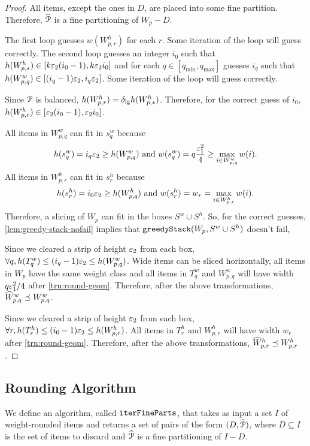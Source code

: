 \rthmPartWide*
\begin{proof}
All items, except the ones in $D$, are placed into some fine partition.
Therefore, $\widehat{\mathcal{P}}$ is a fine partitioning of $W_p - D$.

The first loop guesses $w(W^h_{p,r})$ for each $r$.
Some iteration of the loop will guess correctly.
The second loop guesses an integer $i_0$ such that
$h(W^h_{p,*}) \in [k\varepsilon_2(i_0-1), k\varepsilon_2 i_0]$
and for each $q \in [q_{\min}, q_{\max}]$ guesses $i_q$ such that
$h(W^w_{p,q}) \in [(i_q-1)\varepsilon_2, i_q\varepsilon_2]$.
Some iteration of the loop will guess correctly.

Since $\mathcal{P}$ is balanced, $h(W^h_{p,r}) = \delta_{\mathrm{lg}} h(W^h_{p,*})$.
Therefore, for the correct guess of $i_0$,
$h(W^h_{p,r}) \in [\varepsilon_2(i_0-1), \varepsilon_2 i_0]$.

All items in $W^w_{p,q}$ can fit in $s^w_q$ because
\[ h(s^w_q) = i_q\varepsilon_2 \ge h(W^w_{p,q}) \textrm{ and }
w(s^w_q) = q\frac{\varepsilon_1^2}{4} \ge \max_{i \in W^w_{p,q}} w(i). \]
All items in $W^h_{p,r}$ can fit in $s^h_r$ because
\[ h(s^h_r) = i_0\varepsilon_2 \ge h(W^h_{p,q}) \textrm{ and }
w(s^h_r) = w_r = \max_{i \in W^h_{p,r}} w(i). \]
Therefore, a slicing of $W_p$ can fit in the boxes $S^w \cup S^h$.
So, for the correct guesses, \cref{lem:greedy-stack-nofail} implies that
$\operatorname{\mathtt{greedyStack}}(W_p, S^w \cup S^h)$ doesn't fail,

Since we cleared a strip of height $\varepsilon_2$ from each box,
$\forall q, h(T^w_q) \le (i_q-1)\varepsilon_2 \le h(W^w_{p,q})$.
Wide items can be sliced horizontally, all items in $W_p$ have the same weight class
and all items in $T^w_q$ and $W^w_{p,q}$
will have width $q\varepsilon_1^2/4$ after \cref{trn:round-geom}.
Therefore, after the above transformations, $\widehat{W}^w_{p,q} \preceq W^w_{p,q}$.

Since we cleared a strip of height $\varepsilon_2$ from each box,
$\forall r, h(T^h_r) \le (i_0-1)\varepsilon_2 \le h(W^h_{p,r})$. All items in $T^h_r$
and $W^h_{p,r}$ will have width $w_r$ after \cref{trn:round-geom}.
Therefore, after the above transformations, $\widehat{W}^h_{p,r} \preceq W^h_{p,r}$.
\end{proof}

\rthmPartWideTime*

\subsection{Rounding Algorithm}

We define an algorithm, called $\operatorname{\mathtt{iterFineParts}}$, that takes as input a set $I$ of
weight-rounded items and returns a set of pairs of the form $(D, \widehat{\mathcal{P}})$,
where $D \subseteq I$ is the set of items to discard
and $\widehat{\mathcal{P}}$ is a fine partitioning of $I-D$.

